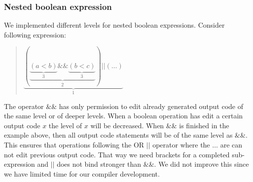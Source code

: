 \subsubsection{Nested boolean expression}
We implemented different levels for nested boolean expressions.
Consider following expression: 
\begin{quote}
$\underbrace{(\underbrace{\underbrace{(a<b)}_{3}\&\&\underbrace{(b<c)}_{3}}_{2})||(\ldots)}_1 $
\end{quote}
The operator $ \&\& $ has only permission to edit already generated output code of the same level or of deeper levels. When a
boolean operation has edit a certain output code $x$ the level of $x$ will be decreased. When $ \&\& $ is finished in the example above,
then all output code statements will be of the same level as $ \&\& $. This ensures that operations following the OR $||$ operator where the
$\ldots$ are can not edit previous output code.
That way we need brackets for a completed sub-expression and $||$ does not bind stronger than $ \&\& $. We did not improve this since we
have limited time for our compiler development.

